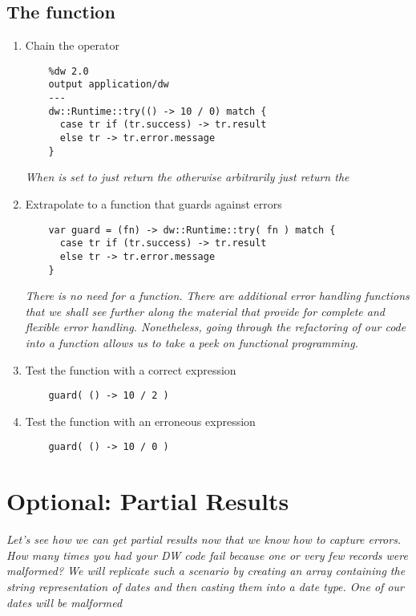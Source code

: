 \begin{enumerate}[resume*]
\end{enumerate}
  
\subsection{The  function}
\begin{enumerate}[resume*]
\item Chain the  operator
  \begin{verbatim}
    %dw 2.0
    output application/dw
    ---
    dw::Runtime::try(() -> 10 / 0) match {
      case tr if (tr.success) -> tr.result
      else tr -> tr.error.message
    }
  \end{verbatim}
  \emph{
    When  is set to  just return the  otherwise arbitrarily just return the  
  }
\item Extrapolate to a function that guards against errors
  \begin{verbatim}
    var guard = (fn) -> dw::Runtime::try( fn ) match {
      case tr if (tr.success) -> tr.result
      else tr -> tr.error.message
    }
  \end{verbatim}
  \emph{
    There is no need for a  function.  There are additional error handling functions that we shall see further along the material that provide for complete and flexible error handling.  Nonetheless, going through the refactoring of our code into a function allows us to take a peek on functional programming.
  }
\item Test the  function with a correct expression
  \begin{verbatim}
    guard( () -> 10 / 2 )
  \end{verbatim}
\item Test the  function with an erroneous expression
  \begin{verbatim}
    guard( () -> 10 / 0 )
  \end{verbatim}  
\end{enumerate}


\section{Optional: Partial Results}
\emph{
  Let’s see how we can get partial results now that we know how to capture errors.
  How many times you had your DW code fail because one or very few records were malformed?
  We will replicate such a scenario by creating an array containing the string representation of dates and then casting them into a date type. One of our dates will be malformed
}


